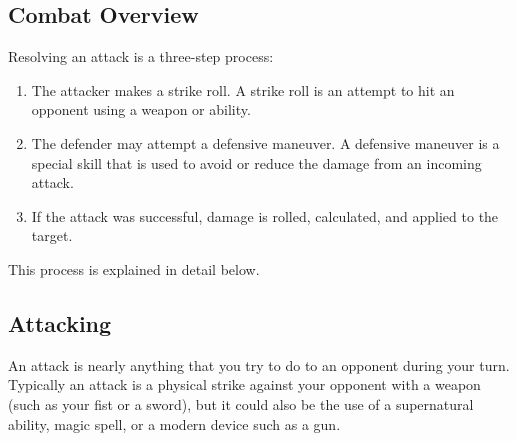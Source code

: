 \documentclass[twoside]{book}
\begin{document}
    

\subsection{Combat Overview}
    
    {  
     Resolving an attack is a three-step process: 
    }
  
\begin{enumerate}
      
  \item   
                  
    {  
     The attacker makes a strike roll. A strike roll
                   is an attempt to hit an opponent using a weapon or
                   ability. 
    }
  
              
  \item   
                  
    {  
     The defender may attempt a defensive maneuver. A
                   defensive maneuver is a special skill that is used to
                   avoid or reduce the damage from an incoming attack.
                   
    }
  
              
  \item   
                  
    {  
     If the attack was successful, damage is rolled,
                   calculated, and applied to the target. 
    }
  
              
\end{enumerate}
  
    {  
     This process is explained in detail below. 
    }
  
    

\subsection{Attacking}
    
    {  
     An attack is nearly anything that you try to do to
               an opponent during your turn. Typically an attack is a
               physical strike against your opponent with a weapon (such
               as your fist or a sword), but it could also be the use of
               a supernatural ability, magic spell, or a modern device
               such as a gun. 
    }
  
\end{document}
